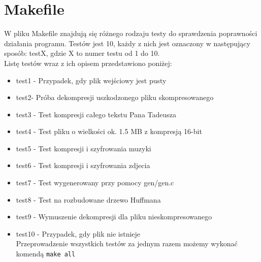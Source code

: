 \documentclass[]{article}
\begin{document}
\section{Makefile}\label{header-n231}
W pliku Makefile znajdują się różnego rodzaju testy do sprawdzenia poprawności działania programu.
Testów jest 10, każdy z nich jest oznaczony w następujący sposób: testX, gdzie X to numer testu od 1 do 10.
\\Listę testów wraz z ich opisem przedstawiono poniżej:
\begin{itemize}
\item
test1 - Przypadek, gdy plik wejściowy jest pusty
\item
test2- Próba dekompresji uszkodzonego pliku skompresowanego
\item
test3 - Test kompresji całego tekstu Pana Tadeusza
\item
test4 - Test pliku o wielkości ok. 1.5 MB z kompresją 16-bit
\item
test5 - Test kompresji i szyfrowania muzyki
\item
test6 - Test kompresji i szyfrowania zdjecia
\item
test7 - Test wygenerowany przy pomocy gen/gen.c
\item
test8 - Test na rozbudowane drzewo Huffmana
\item
test9 - Wymuszenie dekompresji dla pliku nieskompresowanego
\item
test10 - Przypadek, gdy plik nie istnieje\\
Przeprowadzenie wszystkich testów za jednym razem możemy wykonać komendą \texttt{make all}
\end{itemize}
\end{document}
